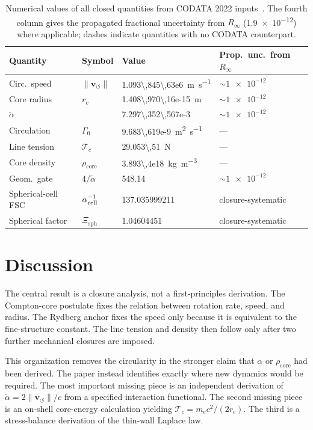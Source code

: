 \documentclass[aps,pra,preprint,longbibliography,nofootinbib]{revtex4-2}
\newcommand{\vnorm}{\lVert\mathbf{v}_{\!\boldsymbol{\circlearrowleft}}\rVert} %
\newcommand{\rhocore}{\rho_{\mathrm{core}}}      %
\newcommand{\rc}{r_c}                            %
\newcommand{\Rinf}{R_\infty}                     %
\newcommand{\Tc}{\mathcal{T}_c}                  %
\newcommand{\Gz}{\Gamma_0}                       %
\newcommand{\Xsph}{\Xi_{\mathrm{sph}}}             %
\begin{document}
\begin{table}[h]
\centering
\caption{Numerical values of all closed quantities from CODATA 2022
inputs~\cite{MohrTaylor2022}.
The fourth column gives the propagated fractional uncertainty from $\Rinf$
(\num{1.9e-12}) where applicable; dashes indicate quantities with no
CODATA counterpart.}
\label{tab:numbers}
\begin{tabular}{llll}
\toprule
Quantity & Symbol & Value & Prop.\ unc.\ from $\Rinf$ \\
\midrule
Circ.\ speed   & $\vnorm$ & \SI{1.093\,845\,63e6}{\m\per\s}      & $\sim\num{1e-12}$ \\
Core radius    & $\rc$    & \SI{1.408\,970\,16e-15}{\meter}       & $\sim\num{1e-12}$ \\
$\tilde\alpha$ &          & \num{7.297\,352\,567e-3}              & $\sim\num{1e-12}$ \\
Circulation    & $\Gz$    & \SI{9.683\,619e-9}{\m\squared\per\s}  & — \\
Line tension   & $\Tc$    & \SI{29.053\,51}{\newton}               & — \\
Core density   & $\rhocore$& \SI{3.893\,4e18}{\kg\per\m\cubed}    & — \\
Geom.\ gate    & $4/\tilde\alpha$ & \num{548.14}               & $\sim\num{1e-12}$ \\
Spherical-cell FSC & $\alpha_{\rm cell}^{-1}$ & \num{137.035999211} & closure-systematic \\
Spherical factor & $\Xsph$ & \num{1.04604451} & closure-systematic \\
\bottomrule
\end{tabular}
\end{table}

\section{Discussion}
\label{sec:discussion}

The central result is a closure analysis, not a first-principles
derivation.  The Compton-core postulate fixes the relation between
rotation rate, speed, and radius.  The Rydberg anchor fixes the speed
only because it is equivalent to the fine-structure constant.  The line
tension and density then follow only after two further mechanical
closures are imposed.

This organization removes the circularity in the stronger claim that
$\alpha$ or $\rho_{\mathrm{core}}$ had been derived.  The paper instead
identifies exactly where new dynamics would be required.  The most
important missing piece is an independent derivation of
$\tilde\alpha=2\vnorm/c$ from a specified interaction functional.  The
second missing piece is an on-shell core-energy calculation yielding
$\mathcal{T}_c=m_ec^2/(2r_c)$.  The third is a stress-balance derivation
of the thin-wall Laplace law.
\end{document}
